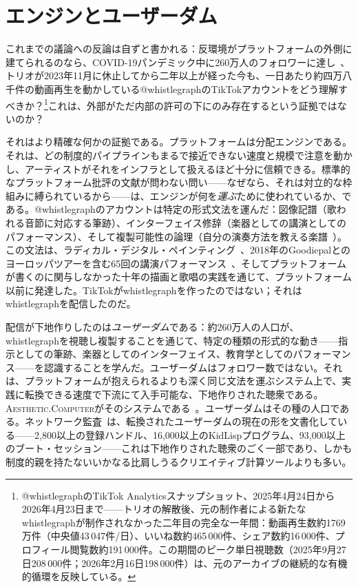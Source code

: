 \documentclass[10pt,letterpaper,twocolumn]{article}
\newcommand{\ac}{\textsc{Aesthetic.Computer}}
\begin{document}
\section{エンジンとユーザーダム}

これまでの議論への反論は自ずと書かれる：反環境がプラットフォームの外側に建てられるのなら、COVID-19パンデミック中に260万人のフォロワーに達し~\citep{scudder2026whistlegraph}、トリオが2023年11月に休止してから二年以上が経った今も、一日あたり約四万八千件の動画再生を動かしている@whistlegraphのTikTokアカウントをどう理解すべきか？\footnote{@whistlegraphのTikTok Analyticsスナップショット、2025年4月24日から2026年4月23日まで——トリオの解散後、元の制作者による新たなwhistlegraphが制作されなかった二年目の完全な一年間：動画再生数約1769万件（中央値43\,047件/日）、いいね数約465\,000件、シェア数約16\,000件、プロフィール閲覧数約191\,000件。この期間のピーク単日視聴数（2025年9月27日208\,000件；2026年2月16日198\,000件）は、元のアーカイブの継続的な有機的循環を反映している。}これは、外部がただ内部の許可の下にのみ存在するという証拠ではないのか？

それはより精確な何かの証拠である。プラットフォームは分配エンジンである。それは、どの制度的パイプラインもまるで接近できない速度と規模で注意を動かし、アーティストがそれをインフラとして扱えるほど十分に信頼できる。標準的なプラットフォーム批評の文献が問わない問い——なぜなら、それは対立的な枠組みに縛られているから——は、エンジンが何を\emph{運ぶ}ために使われているか、である。@whistlegraphのアカウントは特定の形式文法を運んだ：図像記譜（歌われる音節に対応する筆跡）、インターフェイス修辞（楽器としての講演としてのパフォーマンス）、そして複製可能性の論理（自分の演奏方法を教える楽譜~\citep{scudder2026whistlegraph}）。この文法は、ラディカル・デジタル・ペインティング~\citep{scudder2017manifesto, scudder2018rdp35c3}、2018年のGoodiepalとのヨーロッパツアーを含む65回の講演パフォーマンス~\citep{scudder2026goodiepal}、そしてプラットフォームが書くのに関与しなかった十年の描画と歌唱の実践を通じて、プラットフォーム以前に発達した。TikTokがwhistlegraphを作ったのではない；それはwhistlegraphを配信したのだ。

配信が下地作りしたのは\emph{ユーザーダム}である：約260万人の人口が、whistlegraphを視聴し複製することを通じて、特定の種類の形式的な動き——指示としての筆跡、楽器としてのインターフェイス、教育学としてのパフォーマンス——を認識することを学んだ。ユーザーダムはフォロワー数ではない。それは、プラットフォームが抱えられるよりも深く同じ文法を運ぶシステム上で、実践に転換できる速度で下流にて入手可能な、下地作りされた聴衆である。\ac{}がそのシステムである~\citep{scudder2026ac}。ユーザーダムはその種の人口である。ネットワーク監査~\citep{scudder2026audit}は、転換されたユーザーダムの現在の形を文書化している——2,800以上の登録ハンドル、16,000以上のKidLispプログラム、93,000以上のブート・セッション——これは下地作りされた聴衆のごく一部であり、しかも制度的親を持たないいかなる比肩しうるクリエイティブ計算ツールよりも多い。
\end{document}
